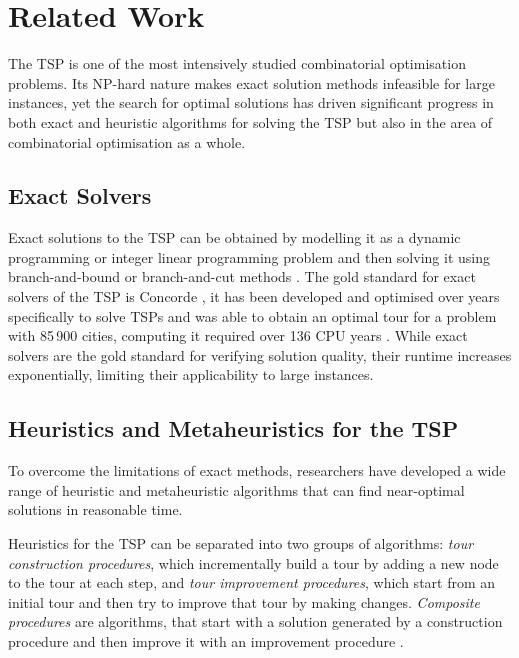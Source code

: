 \section{Related Work}

The TSP is one of the most intensively studied combinatorial optimisation problems.
Its NP-hard nature \cite{garey2002computers} makes exact solution methods infeasible for large instances,
yet the search for optimal solutions has driven significant progress in both exact and heuristic algorithms for solving the TSP
but also in the area of combinatorial optimisation as a whole.


\subsection{Exact Solvers}
Exact solutions to the TSP can be obtained by modelling it as a dynamic programming or integer linear programming problem and then solving it using
branch-and-bound or branch-and-cut methods \cite{suiSurveyDeepLearningbased2025}.
The gold standard for exact solvers of the TSP is Concorde \cite{applegateCertificationOptimalTSP2009}, it has been developed and optimised over years specifically to solve TSPs
and was able to obtain an optimal tour for a problem with 85\,900 cities, computing it required over 136 CPU years \cite{applegateCertificationOptimalTSP2009}.
While exact solvers are the gold standard for verifying solution quality, their runtime increases exponentially, limiting their applicability to large instances.

\subsection{Heuristics and Metaheuristics for the TSP}

To overcome the limitations of exact methods, researchers have developed a wide range of heuristic and metaheuristic algorithms that can find near-optimal solutions in reasonable time.

Heuristics for the TSP can be separated into two groups of algorithms: \textit{tour construction procedures}, which incrementally build a tour by adding a new node to the tour at each step, and \textit{tour improvement procedures}, which start from an initial tour and then try to improve that tour by making changes. \textit{Composite procedures} are algorithms, that start with a solution generated by a construction procedure and then improve it with an improvement procedure \cite{regoLocalSearchMetaheuristics}.

